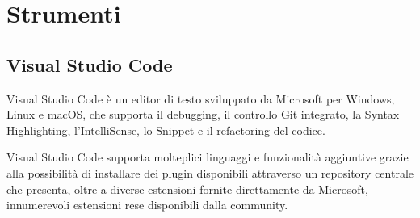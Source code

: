 \section{Strumenti}
\subsection{Visual Studio Code}
Visual Studio Code è un editor di testo sviluppato da Microsoft per Windows, Linux e macOS, che supporta il debugging, il controllo Git integrato, la Syntax Highlighting, l'IntelliSense, lo Snippet e il refactoring del codice. 

Visual Studio Code supporta molteplici linguaggi e funzionalità aggiuntive grazie alla possibilità di installare dei plugin disponibili attraverso un repository centrale che presenta, oltre a diverse estensioni fornite direttamente da Microsoft, innumerevoli estensioni rese disponibili dalla community. 

